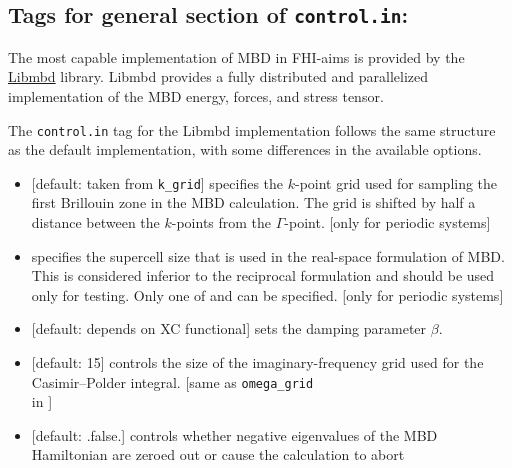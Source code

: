\subsection*{Tags for general section of \texttt{control.in}:}

The most capable implementation of MBD in FHI-aims is provided by the
\href{https://github.com/azag0/libmbd}{Libmbd} library. Libmbd provides a fully distributed and
parallelized implementation of the MBD energy, forces, and stress tensor.

The \texttt{control.in} tag for the Libmbd implementation follows the same structure as the default implementation, with some differences in the available options.


\begin{itemize}
  \item {} [default: taken from
    \texttt{k\_grid}] specifies the $k$-point grid used for sampling
  the first Brillouin zone in the MBD calculation. The grid is shifted
  by half a distance between the $k$-points from the
  $\Gamma$-point. [only for periodic systems] 
  \item {} specifies the supercell size that
  is used in the real-space formulation of MBD\@. This is considered
  inferior to the reciprocal formulation and should be used only for
  testing. Only one of  and  can be
  specified. [only for periodic systems]
  \item {} [default: depends on XC functional] sets the
  damping parameter $\beta$.
  \item {} [default: 15] controls the size of
  the imaginary-frequency grid used for the Casimir--Polder integral. 
  [same as \texttt{omega\_grid} \\
  in ]
  \item {} [default: .false.] controls whether negative eigenvalues of the MBD Hamiltonian are zeroed out or cause the calculation to abort
\end{itemize}

